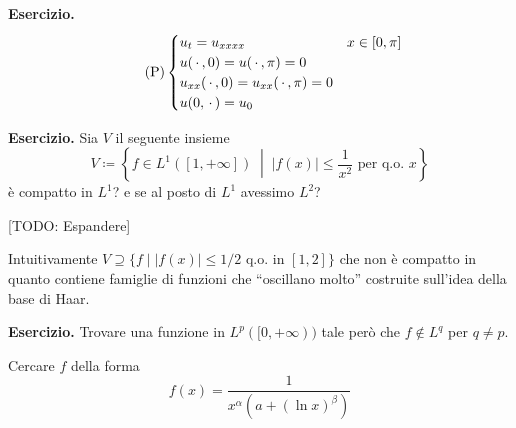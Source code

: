 \textbf{Esercizio.}
\begin{equation}
	\tag{P}
	\begin{cases}
		u_t = u_{xxxx} & x \in [0, \pi] \\
		u(\,\cdot\,, 0) = u(\,\cdot\,, \pi) = 0 \\
		u_{xx}(\,\cdot\,, 0) = u_{xx}(\,\cdot\,, \pi) = 0 \\
		u(0, \,\cdot\,) = u_0
	\end{cases}
\end{equation}

\textbf{Esercizio.}
Sia $V$ il seguente insieme
$$
V \coloneqq \left\{ f \in L^1([1, +\infty]) \;\middle|\; |f(x)| \leq \frac{1}{x^2} \text{ per q.o. } x \right\}
$$
è compatto in $L^1$? e se al posto di $L^1$ avessimo $L^2$?

[TODO: Espandere]

Intuitivamente $V \supseteq \{ f \mid |f(x)| \leq 1 / 2 \text{ q.o. in } [1, 2] \}$ che non è compatto in quanto contiene famiglie di funzioni che ``oscillano molto'' costruite sull'idea della base di Haar.

\textbf{Esercizio.}
Trovare una funzione in $L^p([0, +\infty))$ tale però che $f \notin L^q$ per $q \neq p$.

Cercare $f$ della forma
$$
f(x) = \frac{1}{x^\alpha (a + (\ln x)^\beta)}
$$












